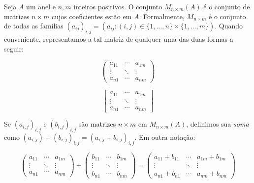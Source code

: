 \begin{definition}
    Seja $A$ um anel e $n, m$ inteiros positivos. O conjunto $M_{n\times m}(A)$ é o conjunto de matrizes $n\times m$ cujos coeficientes estão em $A$. Formalmente, $M_{n\times m}$ é o conjunto de todas as famílias $(a_{ij})_{i,j}=(a_{ij}: (i, j) \in \{1, \dots, n\}\times \{1, \dots, m\})$. Quando conveniente, representamos a tal matriz de qualquer uma das duas formas a seguir:
\begin{multicols}{2}
    \centering
    \begin{equation*}
        \begin{pmatrix}
            a_{11} & \cdots & a_{1m}\\
            \vdots & \ddots & \vdots\\
            a_{n1} & \cdots & a_{nm}
        \end{pmatrix}
    \end{equation*}

    \begin{equation*}
        \begin{bmatrix}
            a_{11} & \cdots & a_{1m}\\
            \vdots & \ddots & \vdots\\
            a_{n1} & \cdots & a_{nm}
        \end{bmatrix}
    \end{equation*}
\end{multicols}

Se $(a_{i, j})_{i,j}$ e $(b_{i, j})_{i,j}$ são matrizes $n\times m$ em $M_{n\times m}(A)$, definimos sua \emph{soma} como $(a_{i, j})+(b_{i, j})_{i,j}=(a_{i, j}+b_{i, j})_{i,j}$.
Em outra notação:

\begin{equation*}
    \begin{pmatrix}
        a_{11} & \cdots & a_{1m}\\
        \vdots & \ddots & \vdots\\
        a_{n1} & \cdots & a_{nm}
    \end{pmatrix}
    +
    \begin{pmatrix}
        b_{11} & \cdots & b_{1m}\\
        \vdots & \ddots & \vdots\\
        b_{n1} & \cdots & b_{nm}
    \end{pmatrix}
    =
    \begin{pmatrix}
        a_{11}+b_{11} & \cdots & a_{1m}+b_{1m}\\
        \vdots & \ddots & \vdots\\
        a_{n1}+b_{n1} & \cdots & a_{nm}+b_{nm}
    \end{pmatrix}
\end{equation*}


\end{definition}
